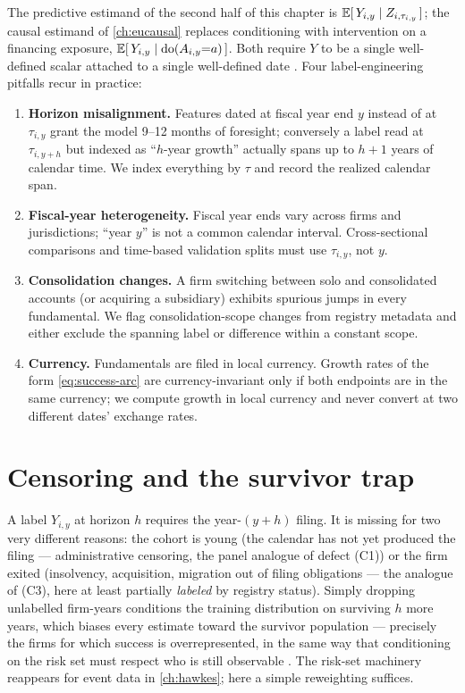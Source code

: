 The predictive estimand of the second half of this chapter is $\mathbb{E}[\,Y_{i,y} \mid
Z_{i,\tau_{i,y}}\,]$; the causal estimand of \cref{ch:eucausal} replaces conditioning with
intervention on a financing exposure, $\mathbb{E}[\,Y_{i,y} \mid \mathrm{do}(A_{i,y}{=}a)\,]$. Both require $Y$
to be a single well-defined scalar attached to a single well-defined date \citep{hernan2020}.
Four label-engineering pitfalls recur in practice:

\begin{enumerate}
\item \textbf{Horizon misalignment.} Features dated at fiscal year end $y$ instead of at
$\tau_{i,y}$ grant the model 9--12 months of foresight; conversely a label read at
$\tau_{i,y+h}$ but indexed as ``$h$-year growth'' actually spans up to $h{+}1$ years of calendar
time. We index everything by $\tau$ and record the realized calendar span.
\item \textbf{Fiscal-year heterogeneity.} Fiscal year ends vary across firms and jurisdictions;
``year $y$'' is not a common calendar interval. Cross-sectional comparisons and time-based
validation splits must use $\tau_{i,y}$, not $y$.
\item \textbf{Consolidation changes.} A firm switching between solo and consolidated accounts
(or acquiring a subsidiary) exhibits spurious jumps in every fundamental. We flag
consolidation-scope changes from registry metadata and either exclude the spanning label or
difference within a constant scope.
\item \textbf{Currency.} Fundamentals are filed in local currency. Growth rates of the form
\cref{eq:success-arc} are currency-invariant only if both endpoints are in the same currency; we
compute growth in local currency and never convert at two different dates' exchange rates.
\end{enumerate}

\section{Censoring and the survivor trap}\label{cheu:sec:censoring}

A label $Y_{i,y}$ at horizon $h$ requires the year-$(y{+}h)$ filing. It is missing for two very
different reasons: the cohort is young (the calendar has not yet produced the filing ---
administrative censoring, the panel analogue of defect (C1)) or the firm exited (insolvency,
acquisition, migration out of filing obligations --- the analogue of (C3), here at least
partially \emph{labeled} by registry status). Simply dropping unlabelled firm-years conditions
the training distribution on surviving $h$ more years, which biases every estimate toward the
survivor population --- precisely the firms for which success is overrepresented, in the same
way that conditioning on the risk set must respect who is still observable \citep{cox1972}. The
risk-set machinery reappears for event data in \cref{ch:hawkes}; here a simple reweighting
suffices.

